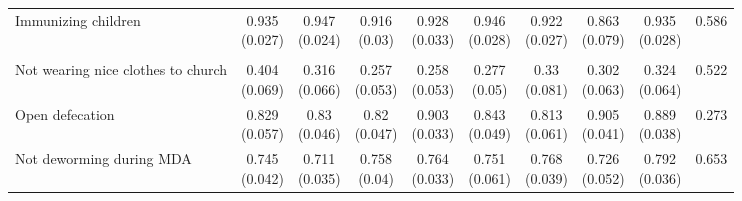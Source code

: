 {\begin{tabular}[t]{lccccccccc}
\hspace{1em}Immunizing children & \makecell[c]{0.935\\(0.027)} & \makecell[c]{0.947\\(0.024)} & \makecell[c]{0.916\\(0.03)} & \makecell[c]{0.928\\(0.033)} & \makecell[c]{0.946\\(0.028)} & \makecell[c]{0.922\\(0.027)} & \makecell[c]{0.863\\(0.079)} & \makecell[c]{0.935\\(0.028)} & 0.586\\
\addlinespace[0.3em]
\hline
\multicolumn{10}{l}{\textit{\textbf{Panel A: Stigma}}}\\
\hline
\hspace{1em}Not wearing nice clothes to church & \makecell[c]{0.404\\(0.069)} & \makecell[c]{0.316\\(0.066)} & \makecell[c]{0.257\\(0.053)} & \makecell[c]{0.258\\(0.053)} & \makecell[c]{0.277\\(0.05)} & \makecell[c]{0.33\\(0.081)} & \makecell[c]{0.302\\(0.063)} & \makecell[c]{0.324\\(0.064)} & 0.522\\
\hspace{1em}Open defecation & \makecell[c]{0.829\\(0.057)} & \makecell[c]{0.83\\(0.046)} & \makecell[c]{0.82\\(0.047)} & \makecell[c]{0.903\\(0.033)} & \makecell[c]{0.843\\(0.049)} & \makecell[c]{0.813\\(0.061)} & \makecell[c]{0.905\\(0.041)} & \makecell[c]{0.889\\(0.038)} & 0.273\\
\hspace{1em}Not deworming during MDA & \makecell[c]{0.745\\(0.042)} & \makecell[c]{0.711\\(0.035)} & \makecell[c]{0.758\\(0.04)} & \makecell[c]{0.764\\(0.033)} & \makecell[c]{0.751\\(0.061)} & \makecell[c]{0.768\\(0.039)} & \makecell[c]{0.726\\(0.052)} & \makecell[c]{0.792\\(0.036)} & 0.653\\

\end{tabular}}
